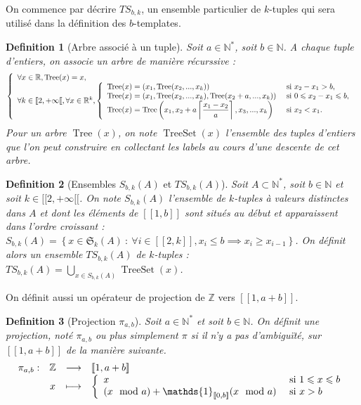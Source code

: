 \documentclass{article}
\newtheorem{definition}{Definition}[section]
\DeclareMathOperator{\tree}{Tree}
\DeclareMathOperator{\treeset}{TreeSet}
\newcommand{\TS}{\mathit{TS}}
\begin{document}
On commence par décrire \(\TS_{b,k}\), un ensemble particulier de \(k\)-tuples qui sera utilisé dans la définition des \(b\)-templates.

\begin{definition}[Arbre associé à un tuple]
Soit \(a \in \mathbb{N}^*\), soit \(b \in \mathbb{N}\). A chaque tuple d'entiers, on associe un arbre de manière récurssive :
\[ \left\{
\begin{array}{l}
	\forall x \in \mathbb{R}, \tree(x) = x, \\
	\forall k \in [\![2, +\infty[\![, \forall x \in \mathbb{R}^k,
		\left\{
		\begin{array}{l l}
			\tree(x) = (x_1, \tree(x_2, ..., x_k)) &  ~\text{si}~ x_2 - x_1 > b, \\
			\tree(x) = (x_1, \tree(x_2, ..., x_k), \tree(x_2 + a, ..., x_k)) &  ~\text{si}~ 0 \leqslant x_2 - x_1 \leqslant b, \\
			\tree(x) = \tree\left(x_1, x_2 + a \left\lceil \dfrac{x_1 - x_2}{a}\right\rceil, x_3, ..., x_k\right) & ~\text{si}~ x_2 < x_1.
		\end{array}
		\right.
\end{array}
\right. \]
Pour un arbre \(\tree(x)\), on note \(\treeset(x)\) l'ensemble des tuples d'entiers que l'on peut construire en collectant les labels au cours d'une descente de cet arbre.
\end{definition}

\begin{definition}[Ensembles \(S_{b,k}(A)\) et \(\TS_{b,k}(A)\)]
Soit \(A \subset \mathbb{N}^*\), soit \(b \in \mathbb{N}\) et soit \(k \in [\![2, +\infty[\![\). On note \(S_{b,k}(A)\) l'ensemble de \(k\)-tuples  à valeurs distinctes dans \(A\) et dont les éléments de \([\![1, b]\!]\) sont situés au début et apparaissent dans l'ordre croissant :\\
\(S_{b,k}(A) = \left\{ x \in \mathfrak{S}_k(A) ~:~ \forall i \in  [\![2, k]\!], x_i \leqslant b \implies x_i \geqslant x_{i -1} \right\}\). On définit alors un ensemble \(\TS_{b,k}(A)\) de \(k\)-tuples : \(\TS_{b,k}(A) = \displaystyle\bigcup\limits_{x \in S_{b,k}(A)} \treeset(x)\).
\end{definition}

On définit aussi un opérateur de projection de \(\mathbb{Z}\) vers \([\![1, a + b]\!]\).

\begin{definition}[Projection \(\pi_{a, b}\)]
Soit \(a \in \mathbb{N}^*\) et soit \(b \in \mathbb{N}\). On définit une projection, noté \(\pi_{a, b}\) ou plus simplement \(\pi\) si il n'y a pas d'ambiguïté, sur \([\![1, a + b]\!]\) de la manière suivante.
\[ \begin{array}{c c c l}
	\pi_{a, b} : & \mathbb{Z} & \longrightarrow & [\![1, a + b]\!] \\
	 & x & \longmapsto & 
		\left\{
		\begin{array}{l l}
			x & ~\text{si}~ 1 \leqslant x \leqslant b \\
			(x \mod a) + \mathds{1}_{[\![0, b]\!]}(x \mod a) & ~\text{si}~ x > b
		\end{array}
		\right.
\end{array} \]
\end{definition}
\end{document}

